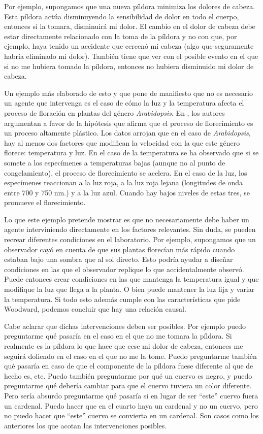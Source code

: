 Por ejemplo, supongamos que una nueva píldora minimiza los dolores de cabeza. Esta píldora actúa disminuyendo la sensibilidad de dolor en todo el cuerpo, entonces si la tomara, disminuirá mi dolor. El cambio en el dolor de cabeza debe estar directamente relacionado con la toma de la píldora y no con que, por ejemplo, haya tenido un accidente que cercenó mi cabeza (algo que seguramente habría eliminado mi dolor). También tiene que ver con el posible evento en el que si no me hubiera tomado la píldora, entonces no hubiera disminuido mi dolor de cabeza.

Un ejemplo más elaborado de esto y que pone de manifiesto que no es necesario un agente que intervenga es el caso de cómo la luz y la temperatura afecta el proceso de floración en plantas del género \emph{Arabidopsis}. En \cite{AusinEnviro}, los autores argumentan a favor de la hipótesis que afirma que el proceso de florecimiento es un proceso altamente plástico. Los datos arrojan que en el caso de \emph{Arabidopsis}, hay al menos dos factores que modifican la velocidad con la que este género florece: temperatura y luz. En el caso de la temperatura se ha observado que si se somete a los especímenes a temperaturas bajas (aunque no al punto de congelamiento), el proceso de florecimiento se acelera. En el caso de la luz, los especímenes reaccionan a la luz roja, a la luz roja lejana (longitudes de onda entre 700 y 750 nm.) y a la luz azul. Cuando hay bajos niveles de estas tres, se promueve el florecimiento.

Lo que este ejemplo pretende mostrar es que no necesariamente debe haber un agente interviniendo directamente en los factores relevantes. Sin duda, se pueden recrear diferentes condiciones en el laboratorio. Por ejemplo, supongamos que un observador cayó en cuenta de que sus plantas florecían más rápido cuando estaban bajo una sombra que al sol directo. Esto podría ayudar a diseñar condiciones en las que el observador replique lo que accidentalmente observó. Puede entonces crear condiciones en las que mantenga la temperatura igual y que modifique la luz que llega a la planta. O bien puede mantener la luz fija y variar la temperatura. Si todo esto además cumple con las características que pide Woodward, podemos concluir que hay una relación causal.

Cabe aclarar que dichas intervenciones deben ser posibles. Por ejemplo puedo preguntarme qué pasaría en el caso en el que no me tomara la píldora. Si realmente es la píldora lo que hace que cese mi dolor de cabeza, entonces me seguirá doliendo en el caso en el que no me la tome. Puedo preguntarme también qué pasaría en caso de que el componente de la píldora fuese diferente al que de hecho es, etc. Puedo también preguntarme por qué un cuervo es negro, y puedo preguntarme qué debería cambiar para que el cuervo tuviera un color diferente. Pero sería absurdo preguntarme qué pasaría si en lugar de ser ``este'' cuervo fuera un cardenal. Puedo hacer que en el cuarto haya un cardenal y no un cuervo, pero no puedo hacer que ``este'' cuervo se convierta en un cardenal. Son casos como los anteriores los que acotan las intervenciones posibles.

